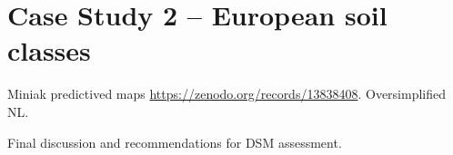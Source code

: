 \documentclass[soil, manuscript]{copernicus}
\begin{document}
\section{Case Study 2 -- European soil classes}

Miniak predictived maps \url{https://zenodo.org/records/13838408}. Oversimplified NL.

\conclusions[Discussion]  %
%
Final discussion and recommendations for DSM assessment.













\end{document}
